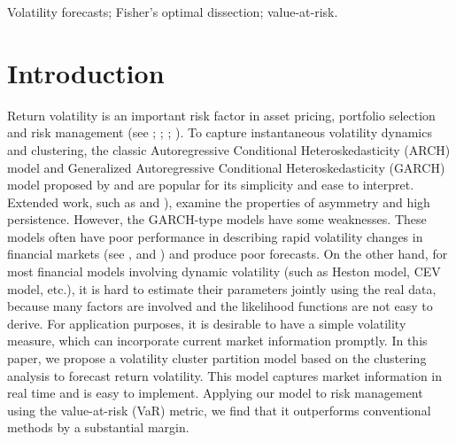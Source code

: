 \documentclass[preprint,12pt,authoryear]{elsarticle}
\begin{document}
\begin{frontmatter}
\begin{keyword}
Volatility forecasts; Fisher's optimal dissection;
value-at-risk. %
\end{keyword}


\end{frontmatter}

\section{Introduction} %
\label{sec:Introduction} Return volatility is an important risk factor in asset pricing, portfolio selection and risk management (see \cite{Angelini2019}; \cite{Schmitt2017}; \cite{Engle2018}; \cite{Chen2019}). To capture instantaneous volatility dynamics and clustering, the classic Autoregressive Conditional Heteroskedasticity (ARCH) model and Generalized Autoregressive Conditional Heteroskedasticity (GARCH) model proposed  by \cite{Engle1982} and \cite{Bollerslev1986} are popular for its simplicity and ease to interpret. Extended work, such as \cite{Nelson1991} and \cite{Engle1993}), examine the properties of asymmetry and high persistence.
However, the GARCH-type models have some weaknesses. These models often 
have poor performance in describing rapid volatility changes in financial markets (see \cite{Andersen2003}, \cite{Hansen2012} and \cite{Smetanina2021}) and produce poor forecasts.
On the other hand,
for most financial models involving dynamic volatility (such as Heston model, CEV model, etc.), it is hard to estimate their parameters jointly using the real data, because many factors are involved and the likelihood functions are not easy to derive.
For application purposes, it is desirable to have a simple volatility measure, which can incorporate current market information promptly. In this paper, we propose a volatility cluster partition model based on the clustering analysis to forecast return volatility. This model captures market information in real time and is easy to implement. Applying our model to risk management using the value-at-risk (VaR) metric, we find that it outperforms conventional methods by a substantial margin.

\end{document}
